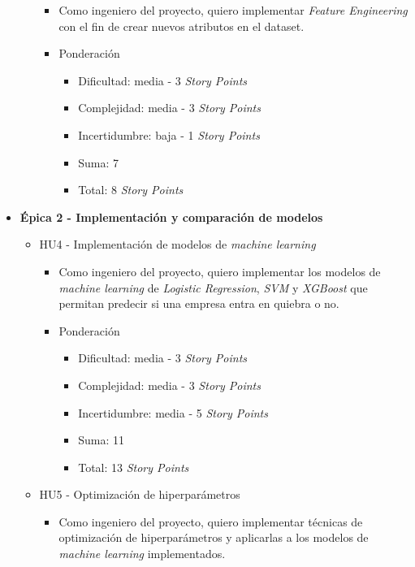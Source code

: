 \documentclass[
11pt, %
]{charter}
\begin{document}
\begin{itemize}
\begin{itemize}
        \begin{itemize}
            \item Como ingeniero del proyecto, quiero implementar \textit{Feature Engineering} con el fin de crear nuevos atributos en el dataset.
            \item Ponderación
            \begin{itemize}
                \item Dificultad: media - 3 \textit{Story Points}
                \item Complejidad: media - 3 \textit{Story Points}
                \item Incertidumbre: baja - 1 \textit{Story Points}
                \item Suma: 7 
                \item Total: 8 \textit{Story Points}
            \end{itemize}
        \end{itemize}
    \end{itemize}
  \item \textbf{\'{E}pica 2 - Implementación y comparación de modelos}
    \begin{itemize}
      \item HU4 - Implementación de modelos de \textit{machine learning}
        \begin{itemize}
            \item Como ingeniero del proyecto, quiero implementar los modelos de \textit{machine learning} de \textit{Logistic Regression}, \textit{SVM} y \textit{XGBoost} que permitan predecir si una empresa entra en quiebra o no.
            \item Ponderación
            \begin{itemize}
                \item Dificultad: media - 3 \textit{Story Points}
                \item Complejidad: media - 3 \textit{Story Points}
                \item Incertidumbre: media - 5 \textit{Story Points}
                \item Suma: 11
                \item Total: 13 \textit{Story Points}
            \end{itemize}
        \end{itemize}
      \item HU5 - Optimización de hiperparámetros
        \begin{itemize}
            \item Como ingeniero del proyecto, quiero implementar técnicas de optimización de hiperparámetros y aplicarlas a los modelos de \textit{machine learning} implementados.

\end{itemize}
\end{itemize}
\end{itemize}
\end{document}

